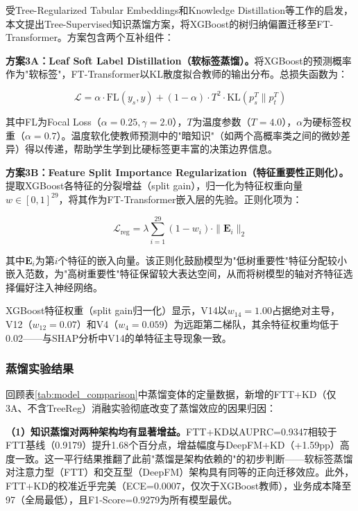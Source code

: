 受Tree-Regularized Tabular Embeddings\cite{li2024tree}和Knowledge Distillation\cite{hinton2015distilling}等工作的启发，本文提出Tree-Supervised知识蒸馏方案，将XGBoost的树归纳偏置迁移至FT-Transformer。方案包含两个互补组件：

\textbf{方案3A：Leaf Soft Label Distillation（软标签蒸馏）。}将XGBoost的预测概率作为"软标签"，FT-Transformer以KL散度拟合教师的输出分布。总损失函数为：

\begin{equation}
\mathcal{L} = \alpha \cdot \text{FL}(y_s, y) + (1-\alpha) \cdot T^2 \cdot \text{KL}(p_s^T \parallel p_t^T)
\end{equation}

其中FL为Focal Loss（$\alpha=0.25, \gamma=2.0$），$T$为温度参数（$T=4.0$），$\alpha$为硬标签权重（$\alpha=0.7$）。温度软化使教师预测中的"暗知识"（如两个高概率类之间的微妙差异）得以传递，帮助学生学到比硬标签更丰富的决策边界信息。

\textbf{方案3B：Feature Split Importance Regularization（特征重要性正则化）。}提取XGBoost各特征的分裂增益（split gain），归一化为特征权重向量$w \in [0,1]^{29}$，将其作为FT-Transformer嵌入层的先验。正则化项为：

\begin{equation}
\mathcal{L}_{\text{reg}} = \lambda \sum_{i=1}^{29} (1 - w_i) \cdot \|\mathbf{E}_i\|_2
\end{equation}

其中$\mathbf{E}_i$为第$i$个特征的嵌入向量。该正则化鼓励模型为"低树重要性"特征分配较小嵌入范数，为"高树重要性"特征保留较大表达空间，从而将树模型的轴对齐特征选择偏好注入神经网络。

XGBoost特征权重（split gain归一化）显示，V14以$w_{14}=1.00$占据绝对主导，V12（$w_{12}=0.07$）和V4（$w_4=0.059$）为远距第二梯队，其余特征权重均低于0.02——与SHAP分析中V14的单特征主导现象一致。

\subsubsection{蒸馏实验结果}

回顾表\ref{tab:model_comparison}中蒸馏变体的定量数据，新增的FTT+KD（仅3A、不含TreeReg）消融实验彻底改变了蒸馏效应的因果归因：

\textbf{（1）知识蒸馏对两种架构均有显著增益。}FTT+KD以AUPRC=0.9347相较于FTT基线（0.9179）提升1.68个百分点，增益幅度与DeepFM+KD（+1.59pp）高度一致。这一平行结果推翻了此前"蒸馏是架构依赖的"的初步判断——软标签蒸馏对注意力型（FTT）和交互型（DeepFM）架构具有同等的正向迁移效应。此外，FTT+KD的校准近乎完美（ECE=0.0007，仅次于XGBoost教师），业务成本降至97（全局最低），且F1-Score=0.9279为所有模型最优。

